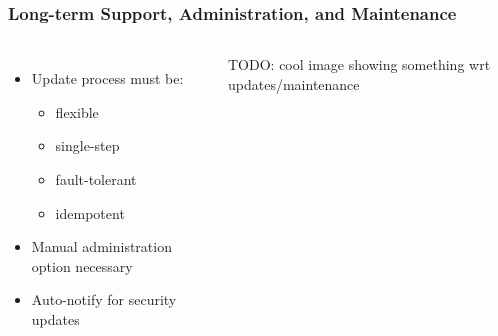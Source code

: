 \begin{frame}
\frametitle{Long-term Support, Administration, and Maintenance}

\begin{columns}[c]


\begin{itemize}
    \item Update process must be:
        \begin{itemize}
            \item flexible
            \item single-step
            \item fault-tolerant
            \item idempotent
        \end{itemize}
    \item Manual administration option necessary
    \item Auto-notify for security updates
\end{itemize}


TODO: cool image showing something wrt updates/maintenance

\end{columns}

\end{frame}
